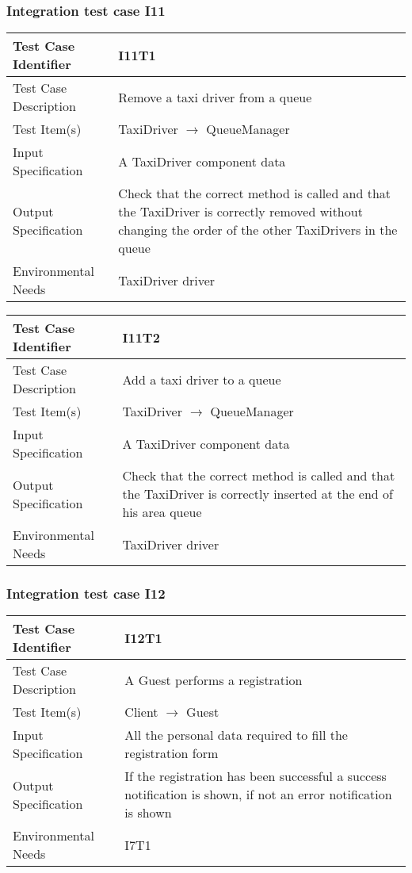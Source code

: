 		\subsubsection{Integration test case I11}
		\begin{center}
			\begin{tabular}{ |l p{10cm}| } \hline
				Test Case Identifier & I11T1 \\ \hline
				Test Case Description & Remove a taxi driver from a queue \\ \hline
				Test Item(s) & TaxiDriver $\rightarrow$ QueueManager \\ \hline
				Input Specification & A TaxiDriver component data \\ \hline
				Output Specification & Check that the correct method is called and that the TaxiDriver is
				correctly removed without changing the order of the other TaxiDrivers in the queue \\ \hline
				Environmental Needs & TaxiDriver driver \\ \hline
			\end{tabular}
			\begin{tabular}{ |l p{10cm}| } \hline
				Test Case Identifier & I11T2 \\ \hline
				Test Case Description & Add a taxi driver to a queue \\ \hline
				Test Item(s) & TaxiDriver $\rightarrow$ QueueManager \\ \hline
				Input Specification & A TaxiDriver component data \\ \hline
				Output Specification & Check that the correct method is called and that the TaxiDriver is
				correctly inserted at the end of his area queue \\ \hline
				Environmental Needs & TaxiDriver driver \\ \hline
			\end{tabular}
		\end{center}
		\subsubsection{Integration test case I12}
		\begin{center}
			\begin{tabular}{ |l p{10cm}| } \hline
				Test Case Identifier & I12T1 \\ \hline
				Test Case Description & A Guest performs a registration \\ \hline
				Test Item(s) & Client $\rightarrow$ Guest \\ \hline
				Input Specification & All the personal data required to fill the registration form \\ \hline
				Output Specification & If the registration has been successful a success notification is shown, if not an error
				notification is shown \\ \hline
				Environmental Needs & I7T1 \\ \hline
			\end{tabular}
		\end{center}
